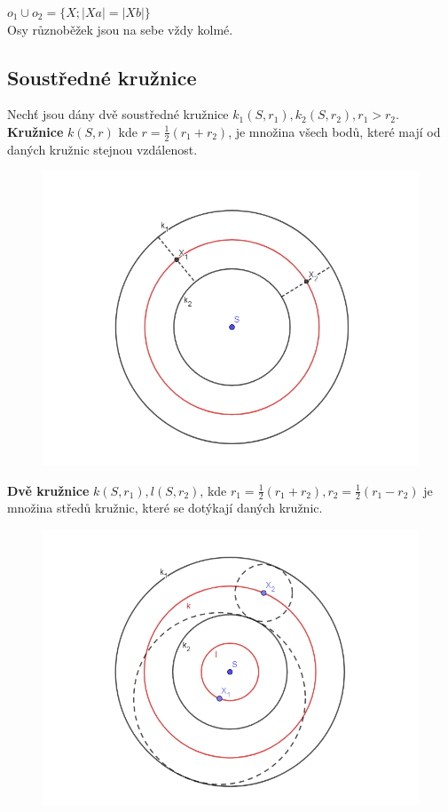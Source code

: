 \documentclass[12pt, a4paper]{article}
\begin{document}
$o_1 \cup o_2 = \{ X; |Xa|= |Xb|\}$\\
Osy různoběžek jsou na sebe vždy kolmé.

\subsection*{Soustředné kružnice}
Nechť jsou dány dvě soustředné kružnice $k_1(S,r_1), k_2(S, r_2), r_1 > r_2$.\\
\textbf{Kružnice} $k(S,r)$ kde $r=\frac{1}{2}(r_1+r_2)$, je množina všech bodů, které mají od daných kružnic stejnou vzdálenost.\\
\begin{figure}[H]
\centering
\includegraphics[scale=0.47]{soustredne1}
\end{figure}

\textbf{Dvě kružnice} $k(S, r_1), l(S, r_2)$, kde $r_1=\frac{1}{2}(r_1+r_2), r_2=\frac{1}{2}(r_1-r_2)$ je množina středů kružnic, které se dotýkají daných kružnic. 
\begin{figure}[H]
\centering
\includegraphics[scale=0.47]{soustredne2}
\end{figure}
\end{document}
